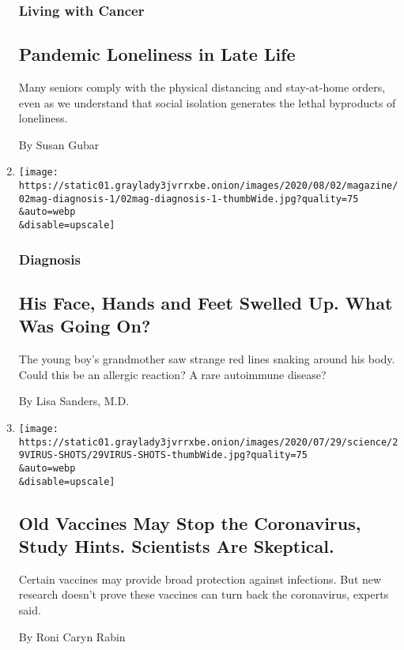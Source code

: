 \begin{enumerate}
{  \subsubsection{Living with Cancer}\label{living-with-cancer}}

  \hypertarget{pandemic-loneliness-in-late-life-1}{%
  \subsection{Pandemic Loneliness in Late
  Life}\label{pandemic-loneliness-in-late-life-1}}

  Many seniors comply with the physical distancing and stay-at-home
  orders, even as we understand that social isolation generates the
  lethal byproducts of loneliness.

  By Susan Gubar
\item
  \href{/2020/07/30/magazine/urticaria-multiforme.html}{}

  \texttt{[image: https://static01.graylady3jvrrxbe.onion/images/2020/08/02/magazine/02mag-diagnosis-1/02mag-diagnosis-1-thumbWide.jpg?quality=75\\\&auto=webp\\\&disable=upscale]}

  \hypertarget{diagnosis}{%
  \subsubsection{Diagnosis}\label{diagnosis}}

  \hypertarget{his-face-hands-and-feet-swelled-up-what-was-going-on}{%
  \subsection{His Face, Hands and Feet Swelled Up. What Was Going
  On?}\label{his-face-hands-and-feet-swelled-up-what-was-going-on}}

  The young boy's grandmother saw strange red lines snaking around his
  body. Could this be an allergic reaction? A rare autoimmune disease?

  By Lisa Sanders, M.D.
\item
  \href{/2020/07/29/health/coronavirus-vaccines.html}{}

  \texttt{[image: https://static01.graylady3jvrrxbe.onion/images/2020/07/29/science/29VIRUS-SHOTS/29VIRUS-SHOTS-thumbWide.jpg?quality=75\\\&auto=webp\\\&disable=upscale]}

  \hypertarget{old-vaccines-may-stop-the-coronavirus-study-hints-scientists-are-skeptical}{%
  \subsection{Old Vaccines May Stop the Coronavirus, Study Hints.
  Scientists Are
  Skeptical.}\label{old-vaccines-may-stop-the-coronavirus-study-hints-scientists-are-skeptical}}

  Certain vaccines may provide broad protection against infections. But
  new research doesn't prove these vaccines can turn back the
  coronavirus, experts said.

  By Roni Caryn Rabin
\end{enumerate}

